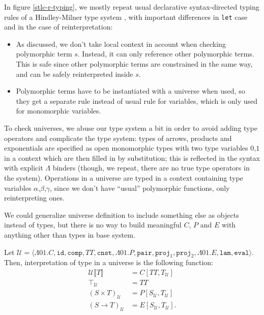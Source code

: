 \documentclass[acmsmall, review, screen, authorversion]{acmart}
\begin{document}
In figure \ref{stlc-r-typing}, we mostly repeat usual declarative
syntax-directed typing rules of a Hindley-Milner type system
\cite{Clement:ML1986}, with important differences in \texttt{let}
case and in the case of reinterpretation:

\begin{itemize}
    \item As discussed, we don't take local context in account when
        checking polymorphic term $s$. Instead, it can only reference
        other polymorphic terms. This is safe since other polymorphic
        terms are constrained in the same way, and can be safely
        reinterpreted inside $s$.
    \item Polymorphic terms have to be instantiated with a universe
        when used, so they get a separate rule instead of usual rule
        for variables, which is only used for monomorphic variables.
\end{itemize}

To check universes, we abuse our type system a bit in order to avoid
adding type operators and complicate the type system: types of
arrows, products and exponentials are specified as open monomorphic
types with two type variables $0$,$1$ in a context which are then
filled in by substitution; this is reflected in the syntax with
explicit $\Lambda$ binders (though, we repeat, there are no true type
operators in the system). Operations in a universe are typed in a
context containing type variables $\alpha$,$\beta$,$\gamma$, since we
don't have ``usual'' polymorphic functions, only reinterpreting ones.

We could generalize universe definition to include something else as
objects instead of types, but there is no way to build meaningful
$C$, $P$ and $E$ with anything other than types in base system.

\begin{definition}
    Let $\mathcal{U}=\langle
        \Lambda 01.C,\mathtt{id},\mathtt{comp},TT,\mathtt{cnst},
        \Lambda 01.P,\mathtt{pair},\mathtt{proj}_1,\mathtt{proj}_2,
        \Lambda 01.E,\mathtt{lam},\mathtt{eval}
    \rangle$. Then, interpretation of type in a universe is the
    following function:
    \begin{align*}
        \mathcal{U}\llbracket T\rrbracket
        &= C[TT,T_\mathcal{U}]\\
        \top_\mathcal{U} &= TT\\
        (S\times T)_\mathcal{U}
        &= P[S_\mathcal{U},T_\mathcal{U}]\\
        (S\to T)_\mathcal{U}
        &= E[S_\mathcal{U},T_\mathcal{U}].
    \end{align*}
\end{definition}
\end{document}
